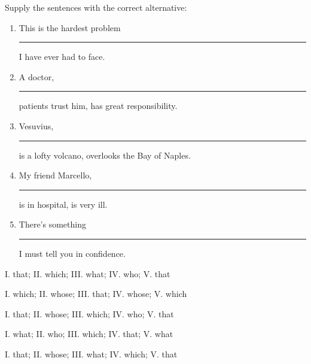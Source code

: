 
\questao
Supply the sentences with the correct alternative: 

\begin{enumerate}[label=\Roman*., noitemsep, topsep=1ex]
\item  This is the hardest problem \rule{1cm}{1pt} I have ever had to face. 
\item  A doctor, \rule{1cm}{1pt} patients trust him, has great responsibility. 
\item  Vesuvius, \rule{1cm}{1pt} is a lofty volcano, overlooks the Bay of Naples. 
\item  My friend Marcello, \rule{1cm}{1pt} is in hospital, is very ill. 
\item  There's something \rule{1cm}{1pt} I must tell you in confidence.
\end{enumerate}

\begin{alternativas}
  \item I. that; II. which; III. what; IV. who; V. that 
  \item I. which; II. whose; III. that; IV. whose; V. which 
  \item I. that; II. whose; III. which; IV. who; V. that 
  \item I. what; II. who; III. which; IV. that; V. what 
  \item I. that; II. whose; III. what; IV. which; V. that
\end{alternativas}



\label{ling-last}